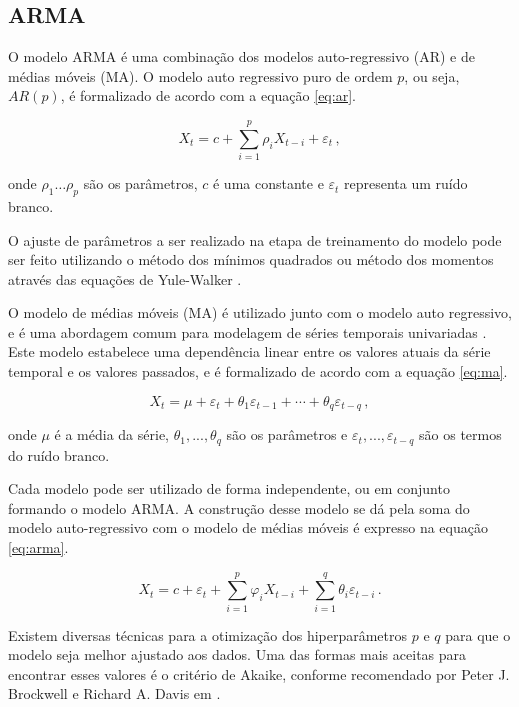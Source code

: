\subsection{ARMA}
O modelo ARMA é uma combinação dos modelos auto-regressivo (AR) e de médias móveis (MA). O modelo auto regressivo puro de ordem $p$, ou seja, $AR(p)$, é formalizado de acordo com a equação \eqref{eq:ar}.

\begin{equation}\label{eq:ar}
    X_{t}=c+\sum ^{p}_{i=1}\rho _{i}X_{t-i}+\varepsilon _{t}\, ,
\end{equation}

onde $\rho _{1}\ldots \rho _{p}$ são os parâmetros, $c$ é uma constante e $\varepsilon _{t}$ representa um ruído branco.

O ajuste de parâmetros a ser realizado na etapa de treinamento do modelo pode ser feito utilizando o método dos mínimos quadrados ou método dos momentos através das equações de Yule-Walker \cite{box&jenkins}.

O modelo de médias móveis (MA) é utilizado junto com o modelo auto regressivo, e é uma abordagem comum para modelagem de séries temporais univariadas \cite{box&jenkins}. Este modelo estabelece uma dependência linear entre os valores atuais da série temporal e os valores passados, e é formalizado de acordo com a equação \eqref{eq:ma}.

\begin{equation}\label{eq:ma}
    X_{t}=\mu+\varepsilon_{t}+\theta_{1} \varepsilon_{t-1}+\cdots+\theta_{q} \varepsilon_{t-q}\, ,
\end{equation}

onde $\mu$ é a média da série, $\theta_{1}, ..., \theta_{q}$ são os parâmetros e $\varepsilon_{t}, ..., \varepsilon_{t-q}$ são os termos do ruído branco.

Cada modelo pode ser utilizado de forma independente, ou em conjunto formando o modelo ARMA. A construção desse modelo se dá pela soma do modelo auto-regressivo com o modelo de médias móveis é expresso na equação \eqref{eq:arma}.

\begin{equation}\label{eq:arma}
    X_{t}=c+\varepsilon_{t}+\sum_{i=1}^{p} \varphi_{i} X_{t-i}+\sum_{i=1}^{q} \theta_{i} \varepsilon_{t-i}\, .
\end{equation}

Existem diversas técnicas para a otimização dos hiperparâmetros $p$ e $q$ para que o modelo seja melhor ajustado aos dados. Uma das formas mais aceitas para encontrar esses valores é o critério de Akaike, conforme recomendado por Peter J. Brockwell e Richard A. Davis em \cite{akaike}.

